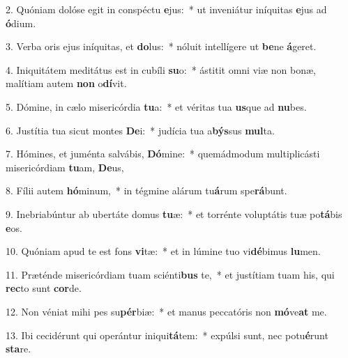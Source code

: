 2. Quóniam dolóse egit in conspéctu \textbf{e}jus:~*  ut inveniátur iníquitas \textbf{e}jus ad \textbf{ó}dium.\

3. Verba oris ejus iníquitas, et \textbf{do}lus:~*  nóluit intellígere ut \textbf{be}ne \textbf{á}geret.\

4. Iniquitátem meditátus est in cubíli \textbf{su}o:~*  ástitit omni viæ non bonæ, malítiam autem \textbf{non} o\textbf{dí}vit.\

5. Dómine, in cælo misericórdia \textbf{tu}a:~*  et véritas tua \textbf{us}que ad \textbf{nu}bes.\

6. Justítia tua sicut montes \textbf{De}i:~*  judícia tua a\textbf{býs}sus \textbf{mul}ta.\

7. Hómines, et juménta salvábis, \textbf{Dó}mine:~*  quemádmodum multiplicásti misericórdiam \textbf{tu}am, \textbf{De}us,\

8. Fílii autem \textbf{hó}minum,~*  in tégmine alárum tu\textbf{á}rum spe\textbf{rá}bunt.\

9. Inebriabúntur ab ubertáte domus \textbf{tu}æ:~*  et torrénte voluptátis tuæ po\textbf{tá}bis \textbf{e}os.\

10. Quóniam apud te est fons \textbf{vi}tæ:~*  et in lúmine tuo vi\textbf{dé}bimus \textbf{lu}men.\

11. Præténde misericórdiam tuam sciénti\textbf{bus} te,~*  et justítiam tuam his, qui \textbf{rec}to sunt \textbf{cor}de.\

12. Non véniat mihi pes su\textbf{pér}biæ:~*  et manus peccatóris non \textbf{mó}ve\textbf{at} me.\

13. Ibi cecidérunt qui operántur iniqui\textbf{tá}tem:~*  expúlsi sunt, nec potu\textbf{é}runt \textbf{sta}re.\

